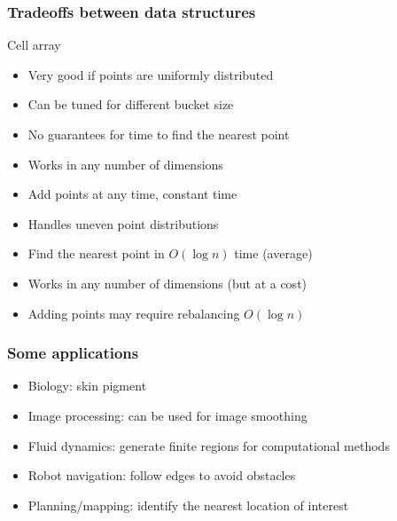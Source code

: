 \documentclass{beamer}
\begin{document}
\begin{frame}
  \frametitle{Tradeoffs between data structures}
  Cell array
  \begin{itemize}[<+->]
  \item Very good if points are uniformly distributed
  \item Can be tuned for different bucket size
  \item No guarantees for time to find the nearest point
  \item Works in any number of dimensions
  \item Add points at any time, constant time
  \end{itemize}
  \vspace{\baselineskip}
  \begin{itemize}[<+->]
  \item Handles uneven point distributions
  \item Find the nearest point in $O(\log n)$ time (average)
  \item Works in any number of dimensions (but at a cost)
  \item Adding points may require rebalancing $O(\log n)$
  \end{itemize}
\end{frame}

\begin{frame}
  \frametitle{Some applications}
  \begin{itemize}[<+->]
  \item Biology: skin pigment
    \vspace{\baselineskip}
  \item Image processing: can be used for image smoothing
    \vspace{\baselineskip}
  \item Fluid dynamics: generate finite regions for computational methods
    \vspace{\baselineskip}
  \item Robot navigation: follow edges to avoid obstacles
    \vspace{\baselineskip}
  \item Planning/mapping: identify the nearest location of interest
  \end{itemize}
\end{frame}
\end{document}
